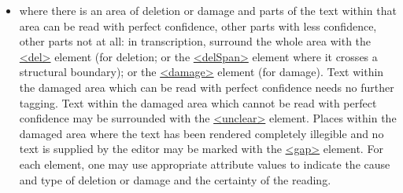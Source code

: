 \begin{itemize}
\item where there is an area of deletion or damage and parts of the text within that area can be read with perfect confidence, other parts with less confidence, other parts not at all: in transcription, surround the whole area with the \hyperref[TEI.del]{<del>} element (for deletion; or the \hyperref[TEI.delSpan]{<delSpan>} element where it crosses a structural boundary); or the \hyperref[TEI.damage]{<damage>} element (for damage). Text within the damaged area which can be read with perfect confidence needs no further tagging. Text within the damaged area which cannot be read with perfect confidence may be surrounded with the \hyperref[TEI.unclear]{<unclear>} element. Places within the damaged area where the text has been rendered completely illegible and no text is supplied by the editor may be marked with the \hyperref[TEI.gap]{<gap>} element. For each element, one may use appropriate attribute values to indicate the cause and type of deletion or damage and the certainty of the reading.
\end{itemize} \par
